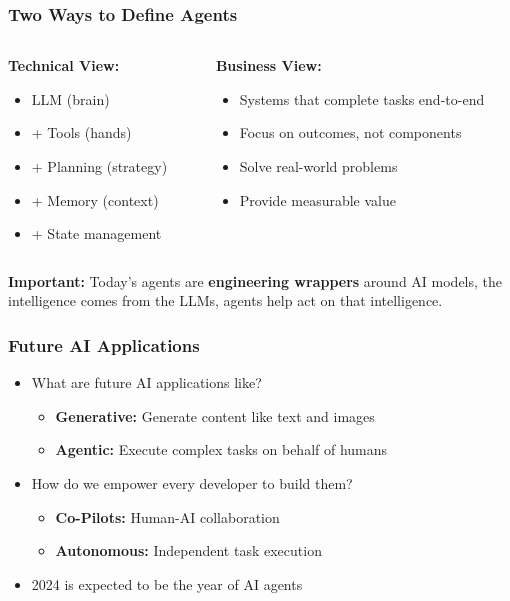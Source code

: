 \begin{frame}[fragile]\frametitle{Two Ways to Define Agents}
\begin{columns}
    \begin{column}[T]{0.5\linewidth}
        \textbf{Technical View:}
        \begin{itemize}
            \item LLM (brain)
            \item + Tools (hands)
            \item + Planning (strategy)
            \item + Memory (context)
            \item + State management
        \end{itemize}
    \end{column}
    \begin{column}[T]{0.5\linewidth}
        \textbf{Business View:}
        \begin{itemize}
            \item Systems that complete tasks end-to-end
            \item Focus on outcomes, not components
            \item Solve real-world problems
            \item Provide measurable value
        \end{itemize}
    \end{column}
\end{columns}

\vspace{0.5cm}
\textbf{Important:} Today's agents are \textbf{engineering wrappers} around AI models, the intelligence comes from the LLMs, agents help act on that intelligence.
\end{frame}

\begin{frame}[fragile]\frametitle{Future AI Applications}
\begin{itemize}
    \item What are future AI applications like?
    \begin{itemize}
        \item \textbf{Generative:} Generate content like text and images
        \item \textbf{Agentic:} Execute complex tasks on behalf of humans
    \end{itemize}
    \item How do we empower every developer to build them?
    \begin{itemize}
        \item \textbf{Co-Pilots:} Human-AI collaboration
        \item \textbf{Autonomous:} Independent task execution
    \end{itemize}
    \item 2024 is expected to be the year of AI agents
\end{itemize}
\end{frame}

